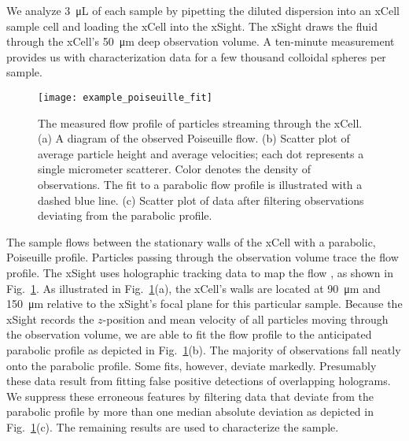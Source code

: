 We analyze \SI{3}{\micro\liter} of each sample by pipetting the diluted dispersion into an
xCell sample cell and loading the xCell into the xSight. The xSight draws the fluid through
the xCell's \SI{50}{\um} deep observation volume. A ten-minute measurement provides us with
characterization data for a few thousand colloidal spheres per sample.

\begin{figure}
    \centering
    \texttt{[image: example\_poiseuille\_fit]}
    \caption{The measured flow profile of particles streaming through the xCell.
      (a)  A diagram of the observed Poiseuille flow.\protect\footnotemark 
      (b) Scatter plot of average particle height and average velocities; each
      dot represents a single micrometer scatterer. Color denotes the density of
      observations. The fit to a parabolic flow profile is illustrated with a dashed
      blue line. (c) Scatter plot of data after filtering observations deviating
      from the parabolic profile.}
    \label{fig:flow_prof}
\end{figure}


The sample flows between the stationary walls of the xCell with a parabolic, Poiseuille
profile.
Particles passing through the observation volume trace the flow profile.
The xSight uses holographic tracking data to map the flow \cite{cheong10a}, as shown
in Fig.~\ref{fig:flow_prof}. As illustrated in Fig.~\ref{fig:flow_prof}(a),
the xCell's walls are located at \SI{90}{\um} and \SI{150}{\um} relative to the
xSight's focal plane for this particular sample.
Because the xSight records the $z$-position and mean 
velocity of all particles moving through the observation volume,
we are able to fit the flow profile to the anticipated parabolic profile
as depicted in Fig.~\ref{fig:flow_prof}(b).
The majority of observations fall neatly onto the parabolic profile.
Some fits, however, deviate markedly. Presumably these data result from fitting
false positive detections of overlapping holograms.
We suppress these erroneous features by filtering data that deviate from
the parabolic profile by more than one median absolute deviation
as depicted in Fig.~\ref{fig:flow_prof}(c). The remaining results are used
to characterize the sample.

